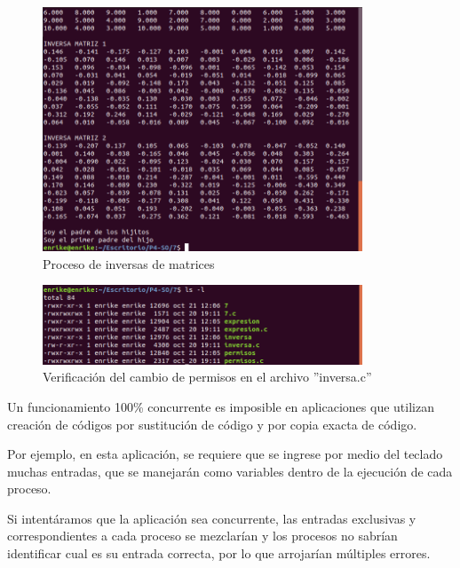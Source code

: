\documentclass[12pt]{article}
\begin{document}
\begin{itemize}
                \newpage
                   \begin{figure}[h!]
                        \centering
                        \includegraphics[width=0.85\textwidth]{Practica4/Images/Linux/7_3.png}
                        \caption{Proceso de inversas de matrices}

                    \end{figure}

                   \begin{figure}[h!]
                        \centering \includegraphics[width=0.85\textwidth]{Practica4/Images/Linux/7_5.png}
                        \caption{Verificación del cambio de permisos en el archivo ''inversa.c''}
                    \end{figure}

                    Un funcionamiento 100\% concurrente es imposible en aplicaciones que utilizan creación de códigos por sustitución de código y por copia exacta de código.
                
                Por ejemplo, en esta aplicación, se requiere que se ingrese por medio del teclado muchas entradas, que se manejarán como variables dentro de la ejecución de cada proceso. 
                
                Si intentáramos que la aplicación sea concurrente, las entradas exclusivas y correspondientes a cada proceso se mezclarían y los procesos no sabrían identificar cual es su entrada correcta, por lo que arrojarían múltiples errores.
                

\end{itemize}
\end{document}
